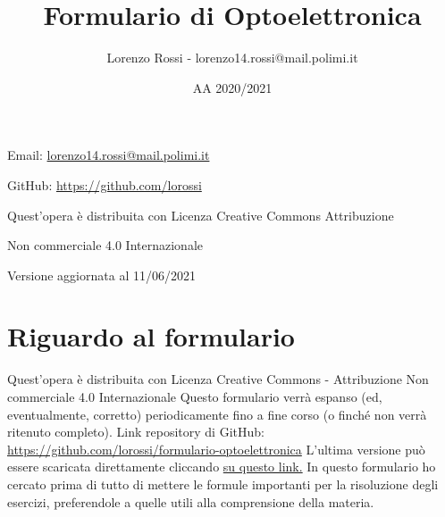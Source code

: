\documentclass{article}
\title{Formulario di Optoelettronica}
\author{Lorenzo Rossi - lorenzo14.rossi@mail.polimi.it}
\date{AA 2020/2021}
\begin{document}
\maketitle

\vspace{18em}

\large
\begin{doublespacing}\hypersetup{
    urlcolor=black,
  }
  \centerline{Email: \href{mailto://lorenzo14.rossi@mail.polimi.it}{lorenzo14.rossi@mail.polimi.it}}
  \centerline{GitHub: \url{https://github.com/lorossi}}

  \vspace{18em}
  \centerline{Quest'opera è distribuita con Licenza Creative Commons Attribuzione}
  \centerline{Non commerciale 4.0 Internazionale \ccbynceu}
  \centerline{Versione aggiornata al 11/06/2021}
\end{doublespacing}
\newpage


\tableofcontents
\clearpage
{}
\newpage

\section{Riguardo al formulario}
Quest'opera è distribuita con Licenza Creative Commons - Attribuzione Non commerciale 4.0 Internazionale \ccbynceu \newline
Questo formulario verrà espanso (ed, eventualmente, corretto) periodicamente fino a fine corso (o finché non verrà ritenuto completo). \newline
Link repository di GitHub: \url{https://github.com/lorossi/formulario-optoelettronica} \newline
L'ultima versione può essere scaricata direttamente cliccando \href{https://github.com/lorossi/formulario-optoelettronica/raw/master/formulario-optoelettronica.pdf}{su questo link.} \newline
In questo formulario ho cercato prima di tutto di mettere le formule importanti per la risoluzione degli esercizi, preferendole a quelle utili alla comprensione della materia.
\end{document}

